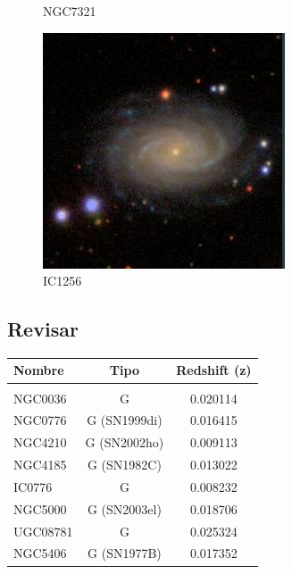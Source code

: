 \documentclass[9pt]{revtex4-1}
\begin{document}
\begin{figure}[h]
\caption{NGC7321}
\includegraphics[scale=0.3]{IC1256.png}
\caption{IC1256}
\end{figure}

\subsection{Revisar}

\begin{center}
\begin{tabular}{ l c c }
Nombre & Tipo & Redshift (z) \\
\hline
\hline \\
NGC0036 & G & 0.020114 \\
NGC0776 & G (SN1999di) & 0.016415 \\
NGC4210 & G (SN2002ho) & 0.009113 \\
NGC4185 & G (SN1982C)  & 0.013022 \\
IC0776  & G & 0.008232 \\
NGC5000 & G (SN2003el) & 0.018706 \\
UGC08781 & G & 0.025324 \\
NGC5406 & G (SN1977B) & 0.017352

\end{tabular}
\end{center}
\end{document}
